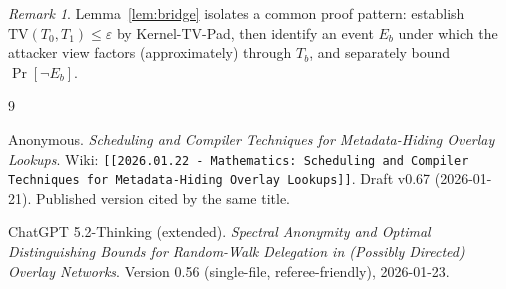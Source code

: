 \documentclass[11pt]{article}
\theoremstyle{remark}
\newtheorem{remark}[theorem]{Remark}
\newcommand{\TV}{\mathrm{TV}}
\begin{document}
\begin{remark}
Lemma~\ref{lem:bridge} isolates a common proof pattern: establish $\TV(T_0,T_1)\le \varepsilon$ by Kernel-TV-Pad,
then identify an event $E_b$ under which the attacker view factors (approximately) through $T_b$, and separately bound $\Pr[\neg E_b]$.
\end{remark}


\begin{thebibliography}{9}\setlength{\itemsep}{0pt}

Anonymous.
\newblock \emph{Scheduling and Compiler Techniques for Metadata-Hiding Overlay Lookups}.
Wiki: \texttt{[[2026.01.22 - Mathematics: Scheduling and Compiler Techniques for Metadata-Hiding Overlay Lookups]]}.
\newblock Draft v0.67 (2026-01-21). Published version cited by the same title.

ChatGPT 5.2-Thinking (extended).
\newblock \emph{Spectral Anonymity and Optimal Distinguishing Bounds for Random-Walk Delegation in (Possibly Directed) Overlay Networks}.
\newblock Version 0.56 (single-file, referee-friendly), 2026-01-23.

\end{thebibliography}
\end{document}
